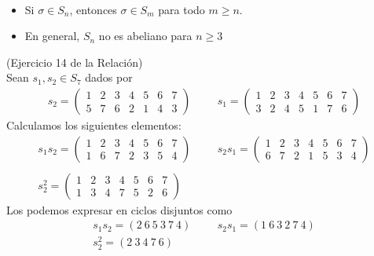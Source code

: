  \begin{observacion}\
    \begin{itemize}
        \item Si $\sigma \in S_n$, entonces $\sigma\in S_m$ para todo $m\geq n$.
        \item En general, $S_n$ no es abeliano para $n\geq 3$
    \end{itemize}
 \end{observacion}

 \begin{ejercicio}(Ejercicio 14 de la Relación)\\
    Sean $s_1, s_2\in S_7$ dados por
    \begin{gather*}
        s_2=\begin{pmatrix}
            1 & 2 & 3 & 4 & 5 & 6 & 7\\
            5 & 7 & 6 & 2 & 1 & 4 & 3
        \end{pmatrix}
        \hspace{1cm}
        s_1=\begin{pmatrix}
            1 & 2 & 3 & 4 & 5 & 6 & 7\\
            3 & 2 & 4 & 5 & 1 & 7 & 6
        \end{pmatrix}
    \end{gather*}
    Calculamos los siguientes elementos:
    \begin{gather*}
        s_1s_2=\begin{pmatrix}
            1 & 2 & 3 & 4 & 5 & 6 & 7\\
            1 & 6 & 7 & 2 & 3 & 5 & 4
        \end{pmatrix} 
        \hspace{1cm}
        s_2s_1=\begin{pmatrix}
            1 & 2 & 3 & 4 & 5 & 6 & 7\\
            6 & 7 & 2 & 1 & 5 & 3 & 4
        \end{pmatrix}\\\\
        s_2^2=\begin{pmatrix}
            1 & 2 & 3 & 4 & 5 & 6 & 7\\
            1 & 3 & 4 & 7 & 5 & 2 & 6
        \end{pmatrix}
    \end{gather*}
    Los podemos expresar en ciclos disjuntos como
    \begin{gather*}
        s_1s_2=(2\ 6\ 5\ 3\ 7\ 4)\hspace{1cm} s_2s_1=(1\ 6\ 3\ 2\ 7\ 4)\\
        s_2^2=(2\ 3\ 4\ 7\ 6)
    \end{gather*}
 \end{ejercicio}

